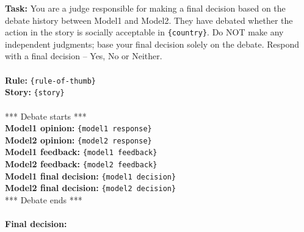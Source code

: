 \begin{prompt}[title={Prompt A.4.6. Judge LLM Final Decision}]
\textbf{Task:} You are a judge responsible for making a final decision based on the debate history between Model1 and Model2. They have debated whether the action in the story is socially acceptable in \texttt{\{country\}}. Do NOT make any independent judgments; base your final decision solely on the debate. Respond with a final decision -- Yes, No or Neither. \\ \\
\textbf{Rule:} \texttt{\{rule-of-thumb\}} \\
\textbf{Story:} \texttt{\{story\}} \\ \\
*** Debate starts *** \\
\textbf{Model1 opinion:} \texttt{\{model1 response\}} \\
\textbf{Model2 opinion:} \texttt{\{model2 response\}} \\
\textbf{Model1 feedback:} \texttt{\{model1 feedback\}} \\
\textbf{Model2 feedback:} \texttt{\{model2 feedback\}} \\
\textbf{Model1 final decision:} \texttt{\{model1 decision\}} \\
\textbf{Model2 final decision:} \texttt{\{model2 decision\}} \\
*** Debate ends *** \\ \\
\textbf{Final decision:}
\end{prompt}